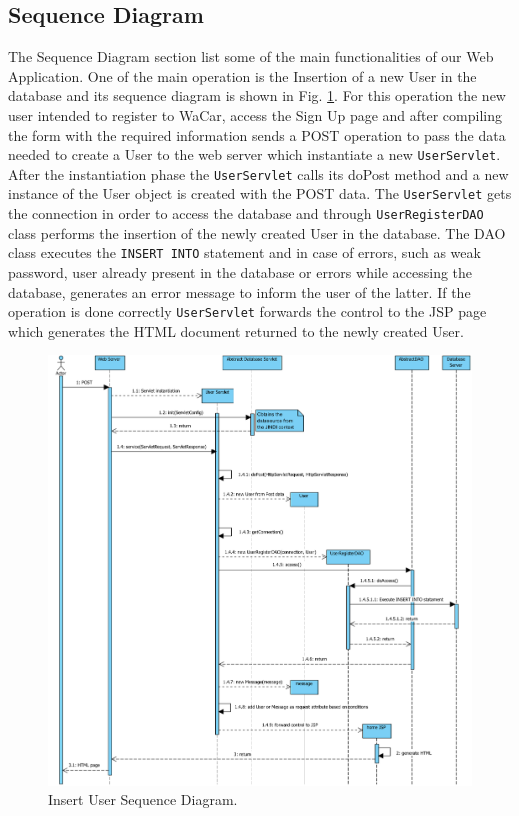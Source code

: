 \subsection{Sequence Diagram}

The Sequence Diagram section list some of the main functionalities of our Web Application.
One of the main operation is the Insertion of a new User in the database and its sequence diagram is shown in Fig. \ref{fig:insertuser}.
For this operation the new user intended to register to WaCar, access the Sign Up page and after compiling the form with the required information
sends a POST operation to pass the data needed to create a User to the web server which instantiate a new \texttt{UserServlet}. After the instantiation phase
the \texttt{UserServlet} calls its doPost method and a new instance of the User object is created with the POST data. The \texttt{UserServlet} gets the connection
in order to access the database and through \texttt{UserRegisterDAO} class performs the insertion of the newly created User in the database. The DAO class executes
the \texttt{INSERT INTO} statement and in case of errors, such as weak password, user already present in the database or errors while accessing the database,
generates an error message to inform the user of the latter. If the operation is done correctly \texttt{UserServlet} forwards the control to the JSP page which
generates the HTML document returned to the newly created User.

\begin{figure}[h]
    \centering
    \includegraphics[width=\textwidth]{mockup/InsertUserDiagram}
    \caption{Insert User Sequence Diagram.}
    \label{fig:insertuser}
\end{figure}


